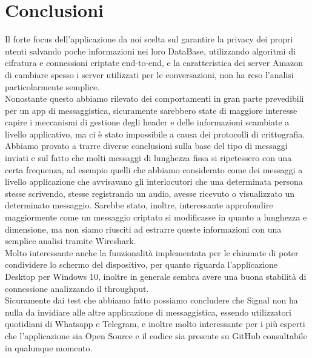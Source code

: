 \documentclass{article}
\begin{document}
  \section{Conclusioni}
  Il forte focus dell'applicazione da noi scelta sul garantire la privacy dei propri utenti salvando poche informazioni nei loro DataBase, 
  utilizzando algoritmi di cifratura e connessioni criptate end-to-end, e la caratteristica dei server Amazon di cambiare spesso i server utilizzati per
  le conversazioni, non ha reso l'analisi particolarmente semplice.\\
  Nonostante questo abbiamo rilevato dei comportamenti in gran parte prevedibili per un app di messaggistica, sicuramente sarebbero state di maggiore interesse
  capire i meccanismi di gestione degli header e delle informazioni scambiate a livello applicativo, ma ci è stato impossibile a causa dei protocolli 
  di crittografia. Abbiamo provato a trarre diverse conclusioni sulla base del tipo di messaggi inviati e sul fatto che molti messaggi di lunghezza fissa si ripetessero
  con una certa frequenza, ad esempio quelli che abbiamo considerato come dei messaggi a livello applicazione che avvisavano gli interlocutori che una determinata persona
  stesse scrivendo, stesse registrando un audio, avesse ricevuto o visualizzato un determinato messaggio. 
  Sarebbe stato, inoltre, interessante approfondire maggiormente come un messaggio criptato si modificasse in quanto a lunghezza e dimensione, ma non siamo riusciti
  ad estrarre queste informazioni con una semplice analisi tramite Wireshark.\\
  Molto interessante anche la funzionalità implementata per le chiamate di poter condividere lo schermo del dispositivo, per quanto riguarda l'applicazione Desktop per Windows 10, 
  inoltre in generale sembra avere una buona stabilità di connessione analizzando il throughput.\\
  Sicuramente dai test che abbiamo fatto possiamo concludere che Signal non ha nulla da invidiare alle altre applicazione di messaggistica, essendo utilizzatori quotidiani
  di Whatsapp e Telegram, e inoltre molto interessante per i più esperti
  che l'applicazione sia Open Source e il codice sia presente su GitHub consultabile in qualunque momento.

  \pagebreak
  
\end{document}
